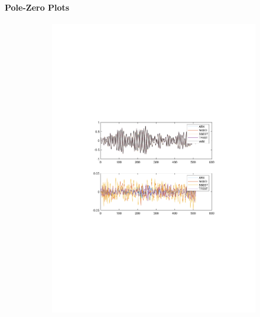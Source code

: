 \documentclass[]{article}
\begin{document}
\paragraph{Pole-Zero Plots}
\begin{figure}[ht]
\centering
\begin{subfigure}{.49\textwidth}
	\centering
	\includegraphics[trim= 10cm 8cm 10cm 8cm, scale=0.4]{figures/predictions.pdf}
\end{subfigure}
\begin{subfigure}{.49\textwidth}
	\centering

\end{subfigure}
\end{figure}
\end{document}
